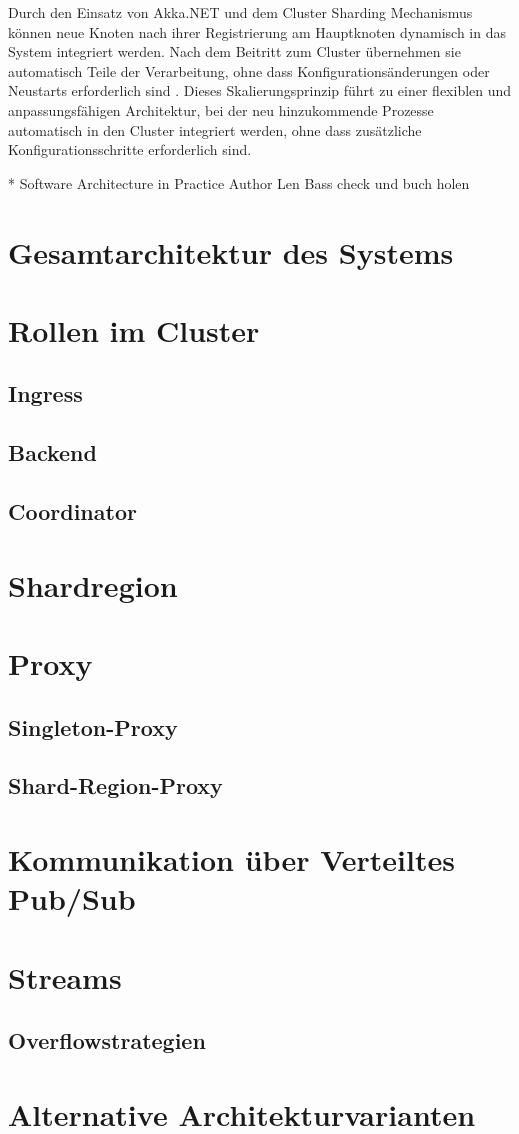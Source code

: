 Durch den Einsatz von Akka.NET und dem Cluster Sharding Mechanismus 
können neue Knoten nach ihrer Registrierung am Hauptknoten dynamisch in das System integriert werden. 
Nach dem Beitritt zum Cluster übernehmen sie automatisch Teile der Verarbeitung, 
ohne dass Konfigurationsänderungen oder Neustarts erforderlich sind \parencite{akkaNet}.
Dieses Skalierungsprinzip führt zu einer flexiblen und anpassungsfähigen Architektur,
bei der neu hinzukommende Prozesse automatisch in den Cluster integriert werden,
ohne dass zusätzliche Konfigurationsschritte erforderlich sind.

* Software Architecture in Practice Author Len Bass check und buch holen
\section{Gesamtarchitektur des Systems}

\section{Rollen im Cluster}
\subsection{Ingress}
\subsection{Backend}
\subsection{Coordinator}

\section{Shardregion}

\section{Proxy}

\subsection{Singleton-Proxy}
\subsection{Shard-Region-Proxy}

\section{Kommunikation über Verteiltes Pub/Sub}

\section{Streams}

\subsection{Overflowstrategien}


\section{Alternative Architekturvarianten}
